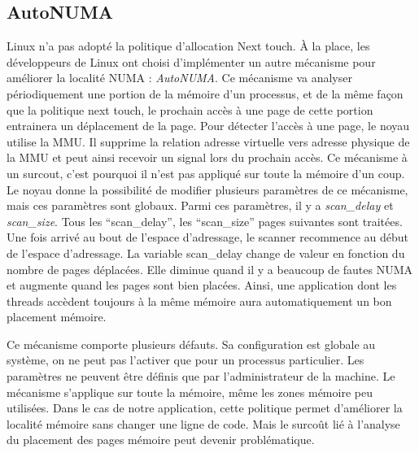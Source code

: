 \subsection{AutoNUMA}
\label{sec:autonuma}
Linux n'a pas adopté la politique d'allocation Next touch.
%
\`A la place, les développeurs de Linux ont choisi d'implémenter un autre mécanisme pour améliorer la localité NUMA : {\em AutoNUMA}.
%
Ce mécanisme va analyser périodiquement une portion de la mémoire d'un processus, et de la même façon que la politique next touch, le prochain accès à une page de cette portion entrainera un déplacement de la page.
%
Pour détecter l'accès à une page, le noyau utilise la MMU.
%
Il supprime la relation adresse virtuelle vers adresse physique de la MMU et peut ainsi recevoir un signal lors du prochain accès.
%
Ce mécanisme à un surcout, c'est pourquoi il n'est pas appliqué sur toute la mémoire d'un coup.
%
Le noyau donne la possibilité de modifier plusieurs paramètres de ce mécanisme, mais ces paramètres sont globaux.
%
Parmi ces paramètres, il y a {\em scan\_delay} et {\em scan\_size}.
%
Tous les ``scan\_delay'', les ``scan\_size'' pages suivantes sont traitées.
%
Une fois arrivé au bout de l'espace d'adressage, le scanner recommence au début de l'espace d'adressage.
%
La variable scan\_delay change de valeur en fonction du nombre de pages déplacées.
%
Elle diminue quand il y a beaucoup de fautes NUMA et augmente quand les pages sont bien placées.
%
Ainsi, une application dont les threads accèdent toujours à la même mémoire aura automatiquement un bon placement mémoire.

Ce mécanisme comporte plusieurs défauts.
%
Sa configuration est globale au système, on ne peut pas l'activer que pour un processus particulier.
%
Les paramètres ne peuvent être définis que par l'administrateur de la machine.
%
Le mécanisme s'applique sur toute la mémoire, même les zones mémoire peu utilisées.
%
Dans le cas de notre application, cette politique permet d'améliorer la localité mémoire sans changer une ligne de code.
%
Mais le surcoût lié à l'analyse du placement des pages mémoire peut devenir problématique.
